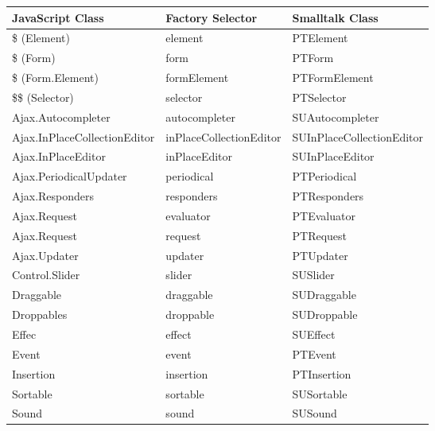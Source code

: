 \documentclass[a4paper,10pt,twoside]{book}
\newcommand{\ct}[1]{{\small\ttfamily\textup{#1}}}
\begin{document}
\begin{tabularx}{\textwidth}{XXX}
\textbf{JavaScript Class }&\textbf{Factory Selector }&\textbf{Smalltalk Class}\\ \hline
 \$ (Element) & \index{PTFactory!element} \ct{element} & \index{PTElement} \ct{PTElement}\\
 \$ (Form) & \index{PTFactory!form} \ct{form} & \index{PTForm} \ct{PTForm} \\
 \$ (Form.Element) & \index{PTFactory!formElement} \ct{formElement} & \index{PTFormElement} \ct{PTFormElement}\\
 \$\$ (Selector) & \index{PTFactory!selector} \ct{selector} & \index{PTSelector} \ct{PTSelector}\\
 Ajax.Autocompleter & \index{PTFactory!autocompleter} \ct{autocompleter} & \index{SUAutocompleter} \ct{SUAutocompleter}\\
 Ajax.InPlaceCollectionEditor & \index{PTFactory!inPlaceCollectionEditor} \ct{inPlaceCollectionEditor} & \index{SUInPlaceCollectionEditor} \ct{SUInPlaceCollectionEditor}\\
 Ajax.InPlaceEditor & \index{PTFactory!inPlaceEditor} \ct{inPlaceEditor} & \index{SUInPlaceEditor} \ct{SUInPlaceEditor} \\
 Ajax.PeriodicalUpdater & \index{PTFactory!periodical} \ct{periodical} & \index{PTPeriodical} \ct{PTPeriodical}\\
 Ajax.Responders & \index{PTFactory!responders} \ct{responders} & \index{PTResponders} \ct{PTResponders}\\
 Ajax.Request & \index{PTFactory!evaluator} \ct{evaluator} & \index{PTEvaluator} \ct{PTEvaluator}\\
 Ajax.Request & \index{PTFactory!request} \ct{request} & \index{PTRequest} \ct{PTRequest}\\
 Ajax.Updater & \index{PTFactory!updater} \ct{updater} & \index{PTUpdater} \ct{PTUpdater}\\
 Control.Slider & \index{PTFactory!slider} \ct{slider} & \index{SUSlider} \ct{SUSlider}\\
 Draggable & \index{PTFactory!draggable} \ct{draggable} & \index{SUDraggable} \ct{SUDraggable}\\
 Droppables & \index{PTFactory!droppable} \ct{droppable} & \index{SUDroppable} \ct{SUDroppable}\\
 Effec & \index{PTFactory!effect} \ct{effect} & \index{SUEffect} \ct{SUEffect}\\
 Event & \index{PTFactory!event} \ct{event} & \index{PTEvent} \ct{PTEvent}\\
 Insertion & \index{PTFactory!insertion} \ct{insertion} & \index{PTInsertion} \ct{PTInsertion}\\
 Sortable & \index{PTFactory!sortable} \ct{sortable} & \index{SUSortable} \ct{SUSortable}\\
 Sound & \index{PTFactory!sound} \ct{sound} & \index{SUSound} \ct{SUSound}\\
\end{tabularx}
\end{document}
